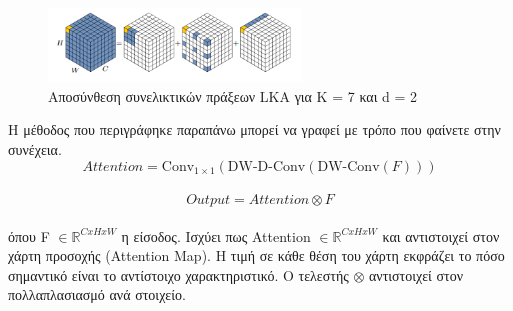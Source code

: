 \documentclass[12pt]{article}
\numberwithin{equation}{section}
\begin{document}
\begin{figure}[h!]
  \centering
  \includegraphics[width=0.6\textwidth]{images/LKA.png} %
  \caption{Αποσύνθεση συνελικτικών πράξεων LKA για K = 7 και d = 2}
  \label{figure 20}
\end{figure} 

\noindent Η μέθοδος που περιγράφηκε παραπάνω μπορεί να γραφεί με τρόπο που φαίνετε στην συνέχεια. \\

\begin{equation}
\textit{Attention} = \text{Conv}_{1 \times 1}(\text{DW-D-Conv}(\text{DW-Conv}(F)))
\end{equation}\\

\begin{equation}
\textit{Output} = \textit{Attention} \otimes F
\end{equation}\\

\noindent όπου F \(\in \mathbb{R}^{C x H x W}\) η είσοδος. Ισχύει πως Attention \(\in \mathbb{R}^{C x H x W}\) και αντιστοιχεί στον χάρτη προσοχής (Attention Map). Η τιμή σε κάθε θέση του χάρτη εκφράζει το πόσο σημαντικό είναι το αντίστοιχο χαρακτηριστικό. Ο τελεστής \( \otimes \) αντιστοιχεί στον πολλαπλασιασμό ανά στοιχείο. \\
\end{document}
